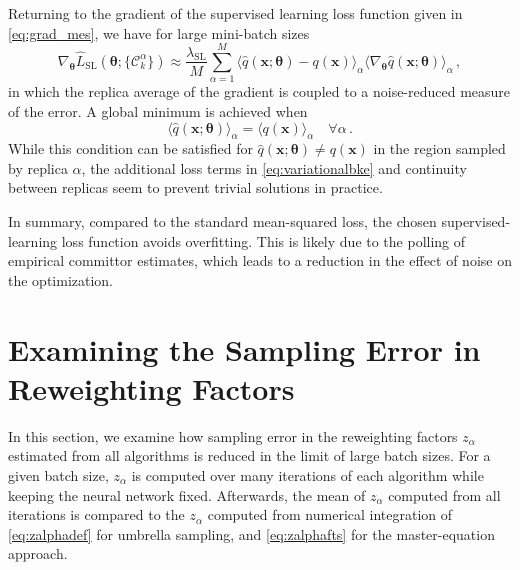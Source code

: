 \documentclass{article}
\numberwithin{equation}{section}
\def\*#1{\mathbf{#1}}
\theoremstyle{definition}
\theoremstyle{remark}
\def\thetab{\boldsymbol{\theta}}
\begin{document}
Returning to the gradient of the supervised learning loss function given in \cref{eq:grad_mes}, we have for large mini-batch sizes
\begin{equation} \label{eq:grad_mes_2}
    \nabla_{\thetab} \hat{L}_\mathrm{SL}(\thetab; \{ \mathcal{C}_k^\alpha \}) \approx \frac{\lambda_{\mathrm{SL}}}{M} \sum_{\alpha=1}^M \langle \hat{q}(\* x; \thetab) - q (\*x ) \rangle_\alpha \langle \nabla_{\thetab} \hat{q}(\* x; \thetab) \rangle_\alpha \,,
\end{equation}
in which the replica average of the gradient is coupled to a noise-reduced measure of the error.
A global minimum is achieved when
\begin{equation}
    \langle \hat{q}(\* x; \thetab) \rangle_\alpha = \langle q (\* x) \rangle_\alpha \quad \forall \alpha \,.
\end{equation}
While this condition can be satisfied for $ \hat{q}(\* x; \thetab) \neq q (\* x) $ in the region sampled by replica $ \alpha $, the additional loss terms in \cref{eq:variationalbke} and continuity between replicas seem to prevent trivial solutions in practice.

In summary, compared to the standard mean-squared loss, the chosen supervised-learning loss function avoids overfitting. 
This is likely due to the polling of empirical committor estimates, which leads to a reduction in the effect of noise on the optimization. 

\section{Examining the Sampling Error in Reweighting Factors} \label{app:ftsme}

In this section, we examine how sampling error in the reweighting factors $z_\alpha$ estimated from all algorithms is reduced in the limit of large batch sizes. For a given batch size, $z_\alpha$ is computed over many iterations of each algorithm while keeping the neural network fixed. Afterwards, the mean of $z_\alpha$ computed from all iterations is compared to the $z_\alpha$ computed from numerical integration of \cref{eq:zalphadef} for umbrella sampling, and \cref{eq:zalphafts} for the master-equation approach. 
\end{document}
